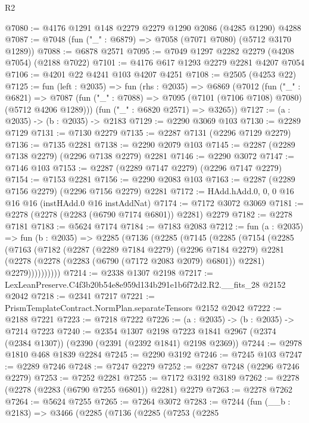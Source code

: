 \begin{lexlean}{R2}
\begin{coremodule}
@7080 := @4176 @1291 @148 @2279 @2279 @1290 @2086 (@4285 @1290) @4288
@7087 := @7048 (fun ("_" : @6879) => @7058 (@7071 @7080) (@5712 @3170 @1289))
@7088 := @6878 @2571
@7095 := @7049 @1297 @2282 @2279 (@4208 @7054) (@2188 @7022)
@7101 := @4176 @617 @1293 @2279 @2281 @4207 @7054
@7106 := @4201 @22 @4241 @103 @4207 @4251
@7108 := @2505 (@4253 @22)
@7125 := fun (left : @2035) =>
  fun (rhs : @2035) =>
  @6869
    (@7012
      (fun ("_" : @6821) =>
      @7087 (fun ("_" : @7088) => @7095 (@7101 (@7106 @7108) @7080) (@5712 @4206 @1289)))
      (fun ("_" : @6820 @2571) => @3265))
@7127 := (a : @2035) -> (b : @2035) -> @2183
@7129 := @2290 @3069 @103
@7130 := @2289 @7129
@7131 := @7130 @2279
@7135 := @2287 @7131 (@2296 @7129 @2279)
@7136 := @7135 @2281
@7138 := @2290 @2079 @103
@7145 := @2287 (@2289 @7138 @2279) (@2296 @7138 @2279) @2281
@7146 := @2290 @3072
@7147 := @7146 @103
@7153 := @2287 (@2289 @7147 @2279) (@2296 @7147 @2279)
@7154 := @7153 @2281
@7156 := @2290 @2083 @103
@7163 := @2287 (@2289 @7156 @2279) (@2296 @7156 @2279) @2281
@7172 := HAdd.hAdd.{0, 0, 0} @16 @16 @16 (instHAdd.{0} @16 instAddNat)
@7174 := @7172 @3072 @3069
@7181 := @2278 (@2278 (@2283 (@6790 @7174 @6801)) @2281) @2279
@7182 := @2278 @7181
@7183 := @5624 @7174
@7184 := @7183 @2083
@7212 := fun (a : @2035) =>
  fun (b : @2035) =>
  @2285
    (@7136
      (@2285
        (@7145
          (@2285
            (@7154
              (@2285
                (@7163
                  (@7182
                    (@2287
                      (@2289 @7184 @2279)
                      (@2296 @7184 @2279)
                      @2281
                      (@2278 (@2278 (@2283 (@6790 (@7172 @2083 @2079) @6801)) @2281) @2279))))))))))
@7214 := @2338 @1307 @2198
@7217 := LexLeanPreserve.C4f3b20b54e8e959d134b291e1b6f72d2.R2.__fits_28 @2152 @2042
@7218 := @2341 @7217
@7221 := PrismTemplateContract.NormPlan.separateTensors @2152 @2042
@7222 := @2188 @7221
@7223 := @7218 @7222
@7226 := (a : @2035) -> (b : @2035) -> @7214 @7223
@7240 := @2354
    @1307
    @2198
    @7223
    @1841
    @2967
    (@2374 (@2384 @1307))
    (@2390 (@2391 (@2392 @1841) @2198 @2369))
@7244 := @2978 @1810 @468 @1839 @2284
@7245 := @2290 @3192
@7246 := @7245 @103
@7247 := @2289 @7246
@7248 := @7247 @2279
@7252 := @2287 @7248 (@2296 @7246 @2279)
@7253 := @7252 @2281
@7255 := @7172 @3192 @3189
@7262 := @2278 (@2278 (@2283 (@6790 @7255 @6801)) @2281) @2279
@7263 := @2278 @7262
@7264 := @5624 @7255
@7265 := @7264 @3072
@7283 := @7244
    (fun (__b : @2183) =>
    @3466
      (@2285
        (@7136
          (@2285
            (@7253
              (@2285

\end{coremodule}
\end{lexlean}
